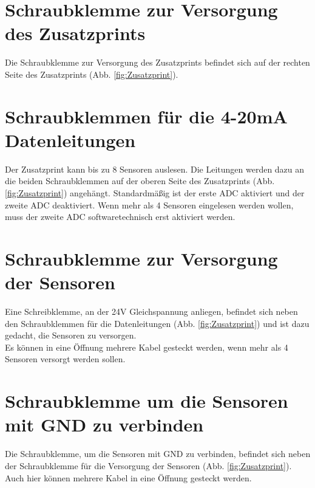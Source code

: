 \section{Schraubklemme zur Versorgung des Zusatzprints}
Die Schraubklemme zur Versorgung des Zusatzprints befindet sich auf der rechten Seite des Zusatzprints (Abb. \ref{fig:Zusatzprint}).

\section{Schraubklemmen für die 4-20mA Datenleitungen}
Der Zusatzprint kann bis zu 8 Sensoren auslesen. Die Leitungen werden dazu an die beiden Schraubklemmen auf der oberen Seite des Zusatzprints (Abb. \ref{fig:Zusatzprint}) angehängt.
Standardmäßig ist der erste ADC aktiviert und der zweite ADC deaktiviert.
Wenn mehr als 4 Sensoren eingelesen werden wollen, muss der zweite ADC softwaretechnisch erst aktiviert werden.

\section{Schraubklemme zur Versorgung der Sensoren}
Eine Schreibklemme, an der 24V Gleichspannung anliegen, befindet sich neben den Schraubklemmen für die Datenleitungen (Abb. \ref{fig:Zusatzprint}) und ist dazu gedacht, die Sensoren zu versorgen.\\
Es können in eine Öffnung mehrere Kabel gesteckt werden, wenn mehr als 4 Sensoren versorgt werden sollen.

\section{Schraubklemme um die Sensoren mit GND zu verbinden}
Die Schraubklemme, um die Sensoren mit GND zu verbinden, befindet sich neben der Schraubklemme für die Versorgung der Sensoren (Abb. \ref{fig:Zusatzprint}).\\
Auch hier können mehrere Kabel in eine Öffnung gesteckt werden.

